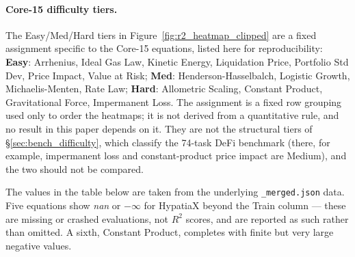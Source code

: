 \documentclass[twoside,11pt]{article}
\newcommand{\Rsq}{R^{2}}
\begin{document}
\paragraph{Core-15 difficulty tiers.}
The Easy/Med/Hard tiers in Figure~\ref{fig:r2_heatmap_clipped} are a fixed assignment
specific to the Core-15 equations, listed here for reproducibility:
\textbf{Easy}: Arrhenius, Ideal Gas Law, Kinetic Energy, Liquidation Price,
Portfolio Std Dev, Price Impact, Value at Risk;
\textbf{Med}: Henderson-Hasselbalch, Logistic Growth, Michaelis-Menten, Rate Law;
\textbf{Hard}: Allometric Scaling, Constant Product, Gravitational Force,
Impermanent Loss.
The assignment is a fixed row grouping used only to order the heatmaps; it is not derived from a quantitative rule, and no result in this paper depends on it.
They are not the structural tiers of §\ref{sec:bench_difficulty}, which classify the
74-task DeFi benchmark (there, for example, impermanent loss and constant-product
price impact are Medium), and the two should not be compared.

The values in the table below are taken from the underlying \texttt{\_merged.json}
data. Five equations show \textit{nan} or $-\infty$ for HypatiaX beyond the Train
column --- these are missing or crashed evaluations, not $\Rsq$ scores, and are
reported as such rather than omitted. A sixth, Constant Product, completes with
finite but very large negative values.
\end{document}
